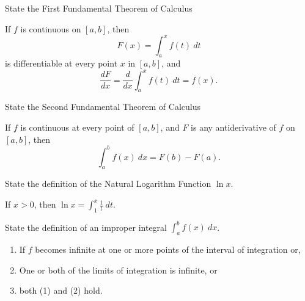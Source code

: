 \begin{questions}
    \question[1] State the First Fundamental Theorem of Calculus
    \begin{solution}
        \begin{theorem}
            If $f$ is continuous on $[a, b]$, then
            $$F(x) = \int_a^x f(t)\ dt$$
            is differentiable at every point $x$ in $[a, b]$, and
            $$\frac{dF}{dx} = \frac{d}{dx} \int_a^x f(t)\ dt = f(x).$$
        \end{theorem}
    \end{solution}

    \question[1] State the Second Fundamental Theorem of Calculus
    \begin{solution}
        \begin{theorem}
            If $f$ is continuous at every point of $[a, b]$, and $F$
            is any antiderivative of $f$ on $[a, b]$, then
            $$\int_a^b f(x)\ dx = F(b) - F(a).$$
        \end{theorem}
    \end{solution}

    \question[1] State the definition of the Natural Logarithm
    Function $\ln x$.
    \begin{solution}
        \begin{definition}
            If $x > 0$, then $\ln x = \int_1^x \frac{1}{t}\ dt.$
        \end{definition}
    \end{solution}

    \question[1] State the definition of an improper integral
    $\int_a^b f(x)\ dx$.
    \begin{solution}
        \begin{definition}
            \begin{enumerate}
            \item If $f$ becomes infinite at one or more points of the
                interval of integration or,  
            \item One or both of the limits of integration is
                infinite, or
            \item both (1) and (2) hold.
            \end{enumerate}
        \end{definition}
    \end{solution}
\end{questions}

